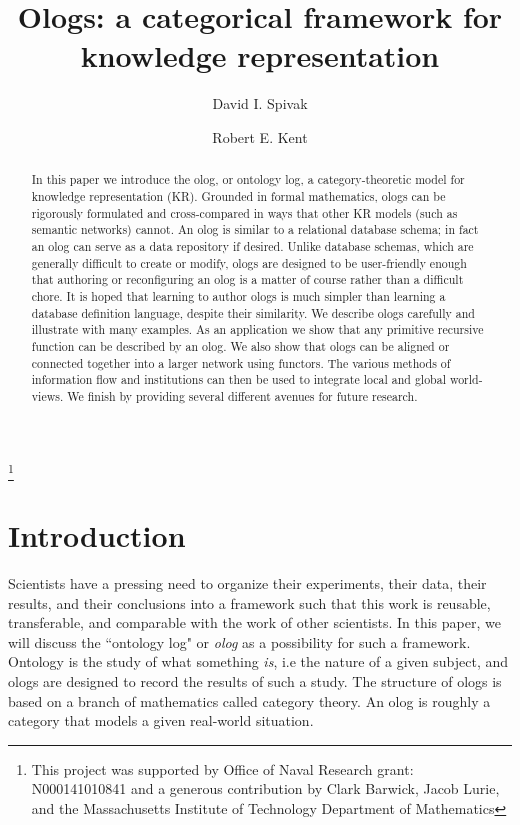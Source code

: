\title{Ologs: a categorical framework for knowledge representation}
\author{David I. Spivak}
\address{Mathematics, MIT, Cambridge, MA 02139}
\author{Robert E. Kent}
\address{Ontologos}
\thanks{This project was supported by Office of Naval Research grant: N000141010841 and a generous contribution by Clark Barwick, Jacob Lurie, and the Massachusetts Institute of Technology Department of Mathematics}

\begin{abstract}
In this paper we introduce the olog, or ontology log, 
a category-theoretic model for knowledge representation (KR). 
Grounded in formal mathematics, 
ologs can be rigorously formulated and cross-compared in ways that other KR models (such as semantic networks) cannot. 
An olog is similar to a relational database schema; 
in fact an olog can serve as a data repository if desired. 
Unlike database schemas, which are generally difficult to create or modify, 
ologs are designed to be user-friendly enough 
that authoring or reconfiguring an olog is a matter of course rather than a difficult chore. 
It is hoped that learning to author ologs is much simpler than learning a database definition language, 
despite their similarity. 
We describe ologs carefully and illustrate with many examples. 
As an application we show that any primitive recursive function can be described by an olog. 
We also show that ologs can be aligned or connected together into a larger network using functors. 
The various methods of information flow and institutions can then be used to integrate local and global world-views. 
We finish by providing several different avenues for future research.
\end{abstract}

\maketitle
\tableofcontents

\section{Introduction}\label{sec:intro}

Scientists have a pressing need to organize their experiments, their data, their results, and their conclusions into a framework such that this work is reusable, transferable, and comparable with the work of other scientists. In this paper, we will discuss the ``ontology log" or {\em olog} as a possibility for such a framework. Ontology is the study of what something {\em is}, i.e the nature of a given subject, and ologs are designed to record the results of such a study. The structure of ologs is based on a branch of mathematics called category theory. An olog is roughly a category that models a given real-world situation. 

